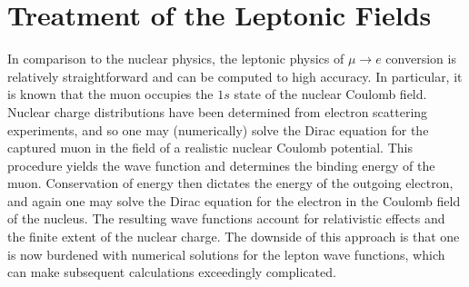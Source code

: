 \documentclass[12pt,letterpaper]{book}
\begin{document}
\chapter{Treatment of the Leptonic Fields}
\label{chap:leptonic}
\thispagestyle{headings}
In comparison to the nuclear physics, the leptonic physics of $\mu\rightarrow e$ conversion is relatively straightforward and can be computed to high accuracy. In particular, it is known that the muon occupies the $1s$ state of the nuclear Coulomb field. 
Nuclear charge distributions have been determined from electron scattering experiments, and so one may (numerically) solve the Dirac equation for the captured muon in the field of a realistic nuclear Coulomb potential. This procedure yields the wave function and determines the binding energy of the muon. Conservation of energy then dictates the energy of the outgoing electron, and again one may solve the Dirac equation for the electron in the Coulomb field of the nucleus. The resulting wave functions account for relativistic effects and the finite extent of the nuclear charge. The downside of this approach is that one is now burdened with numerical solutions for the lepton wave functions, which can make subsequent calculations exceedingly complicated.
\end{document}

